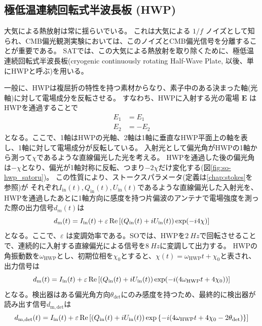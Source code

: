 \documentclass[../../main.tex]{subfiles}
\begin{document}
\subsection{極低温連続回転式半波長板 (HWP)}
\label{sec:HWP}
大気による熱放射は常に揺らいでいる。
これは大気による $1/f$ ノイズとして知られ、CMB偏光観測実験においては、このノイズとCMB偏光信号を分離することが重要である。
SATでは、この大気による熱放射を取り除くために、極低温連続回転式半波長板(cryogenic continuously rotating Half-Wave Plate, 以後、単にHWPと呼ぶ)を用いる。\cite{so:hwp_yamada}

一般に、HWPは複屈折の特性を持つ素材からなり、素子中のある決まった軸(光軸)に対して電場成分を反転させる。
すなわち、HWPに入射する光の電場 $\bm{E}$ はHWPを通過することで
\begin{align}
    E_{1} &= E_{1} \\
    E_{2} &= -E_{2}
\end{align}
となる。ここで、1軸はHWPの光軸、2軸は1軸に垂直なHWP平面上の軸を表し、1軸に対して電場成分が反転している。
入射光として偏光角がHWPの1軸から測って$\chi$であるような直線偏光した光を考える。
HWPを通過した後の偏光角は$-\chi$となり、偏光が1軸対称に反転、つまり$-2\chi$だけ変化する(図\ref{fig:so-hwp_satoru})。
この性質により、ストークスパラメータ(定義は\ref{chap:stokes}を参照)が
それぞれ$I_{\mathrm{in}}(t), Q_{\mathrm{in}}(t), U_{\mathrm{in}}(t)$であるような直線偏光した入射光を、
HWPを通過したあとに1軸方向に感度を持つ片偏波のアンテナで電場強度を測った際の出力信号$d_m(t)$は
\begin{equation}
    d_{\mathrm{m}}(t) = I_{\mathrm{in}}(t) + \varepsilon\Re\qty[\qty(Q_{\mathrm{in}}(t)+iU_{\mathrm{in}}(t))\exp(-i 4\chi)]
\end{equation}
となる。ここで、$\varepsilon$ は変調効率である。SOでは、HWPを$\SI{2}{Hz}$で回転させることで、連続的に入射する直線偏光による信号を$\SI{8}{Hz}$に変調して出力する。
HWPの角振動数を$\omega_{\mathrm{HWP}}$とし、初期位相を$\chi_0$とすると、$\chi(t) = \omega_{\mathrm{HWP}}t + \chi_{0}$と表され、出力信号は
\begin{equation}
    d_{\mathrm{m}}(t) = I_{\mathrm{in}}(t) + \varepsilon\Re\qty[\qty(Q_{\mathrm{in}}(t)+iU_{\mathrm{in}}(t))\exp(-i \qty(4\omega_{\mathrm{HWP}}t + 4\chi_0))]
\end{equation}
となる。検出器はある偏光角方向$\theta_{\mathrm{det}}$にのみ感度を持つため、最終的に検出器が読み出す信号$d_{\mathrm{m}, \mathrm{det}}$は
\begin{equation}
    \label{eq:so-hwp_modulation}
    d_{\mathrm{m}, \mathrm{det}}(t) = I_{\mathrm{in}}(t) + \varepsilon\Re\qty[\qty(Q_{\mathrm{in}}(t)+iU_{\mathrm{in}}(t))\exp\qty{-i \qty(4\omega_{\mathrm{HWP}}t + 4\chi_0 - 2\theta_{\mathrm{det}})}]
\end{equation}
\end{document}
